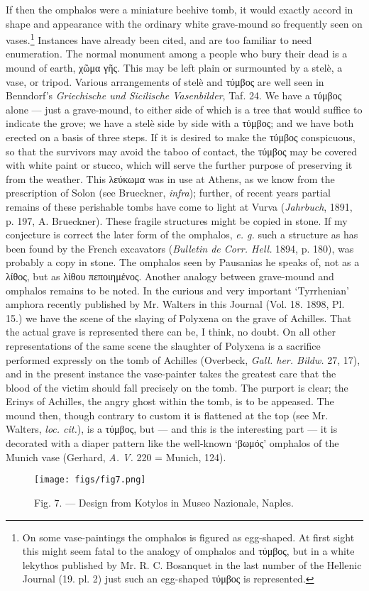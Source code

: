 \documentclass[a4paper, 11pt, oneside, polutonikogreek, english]{article}
\begin{document}
If then the omphalos were a miniature beehive tomb, it would exactly accord in shape and appearance with the ordinary white grave-mound so frequently seen on vases.\footnote{On some vase-paintings the omphalos is figured as egg-shaped. At first sight this might seem fatal to the analogy of omphalos and τύμβος, but in a white lekythos published by Mr. R. C. Bosanquet in the last number of the Hellenic Journal (19. pl. 2) just such an egg-shaped τύμβος is represented.} Instances have already been cited, and are too familiar to need enumeration. The normal monument among a people who bury their dead is a mound of earth, χῶμα γῆς. This may be left plain or surmounted by a stelè, a vase, or tripod. Various arrangements of stelè and τύμβος are well seen in Benndorf's \emph{Griechische und Sicilische Vasenbilder}, Taf. 24. We have a τύμβος alone --- just a grave-mound, to either side of which is a tree that would suffice to indicate the grove; we have a stelè side by side with a τύμβος; and we have both erected on a basis of three steps. If it is desired to make the τύμβος conspicuous, so that the survivors may avoid the taboo of contact, the τύμβος may be covered with white paint or stucco, which will serve the further purpose of preserving it from the weather. This λεύκωμα was in use at Athens, as we know from the prescription of Solon (see Brueckner, \emph{infra}); further, of recent years partial remains of these perishable tombs have come to light at Vurva (\emph{Jahrbuch}, 1891, p. 197, A. Brueckner). These fragile structures might be copied in stone. If my conjecture is correct the later form of the omphalos, \emph{e. g.} such a structure as has been found by the French excavators (\emph{Bulletin de Corr. Hell.} 1894, p. 180), was probably a copy in stone. The omphalos seen by Pausanias he speaks of, not as a λίθος, but as λίθου πεποιημένος. Another analogy between grave-mound and omphalos remains to be noted. In the curious and very important `Tyrrhenian' amphora recently published by Mr. Walters in this Journal (Vol. 18. 1898, Pl. 15.) we have the scene of the slaying of Polyxena on the grave of Achilles. That the actual grave is represented there can be, I think, no doubt. On all other representations of the same scene the slaughter of Polyxena is a sacrifice performed expressly on the tomb of Achilles (Overbeck, \emph{Gall. her. Bildw.} 27, 17), and in the present instance the vase-painter takes the greatest care that the blood of the victim should fall precisely on the tomb. The purport is clear; the Erinys of Achilles, the angry ghost within the tomb, is to be appeased. The mound then, though contrary to custom it is flattened at the top (see Mr. Walters, \emph{loc. cit.}), is a τύμβος, but --- and this is the interesting part --- it is decorated with a diaper pattern like the well-known `βωμός' omphalos of the Munich vase (Gerhard, \emph{A. V.} 220 = Munich, 124).
\begin{figure}[H]
\centering
\texttt{[image: figs/fig7.png]}
\caption{Fig. 7. --- Design from Kotylos in Museo Nazionale, Naples.}
\end{figure}
\end{document}
